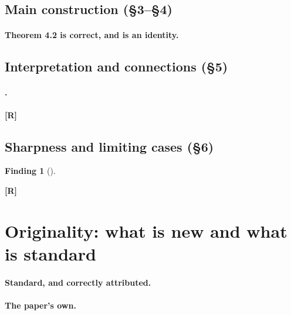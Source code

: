 \documentclass[11pt]{article}
\newcommand{\pk}{P0}
\newif\ifdraftnotes     \draftnotesfalse    %
\newcommand{\defR}{\textbf{[R]}}   %
\theoremstyle{definition}
\newtheorem{finding}{Finding}
\newcommand{\flabel}[1]{\label{\pk:f:#1}}          %
\newcommand{\note}[1]{\ifdraftnotes\textcolor{red}{\small[\,#1\,]}\fi}
\newcommand{\ms}[1]{\S#1}
\begin{document}
\subsection{Main construction (\ms{3}--\ms{4})}

\paragraph{Theorem 4.2 is correct, and is an identity.} \note{\dots}

\subsection{Interpretation and connections (\ms{5})}

\paragraph{\note{Claim made in passing}.} \note{Claims made in passing are held
to the same standard as theorems, and are the usual source of [R] items.}
\defR

\subsection{Sharpness and limiting cases (\ms{6})}

\begin{finding}[\note{Statement}]\flabel{key-two}
\note{\dots}
\defR
\end{finding}

\section{Originality: what is new and what is standard}

\paragraph{Standard, and correctly attributed.} \note{Enumerate the inherited
apparatus and say whether each is cited at its point of use.}

\paragraph{The paper's own.} \note{Enumerate the contributions that survive the
audit, one clause each, and say for each what makes it non-obvious.}
\end{document}
